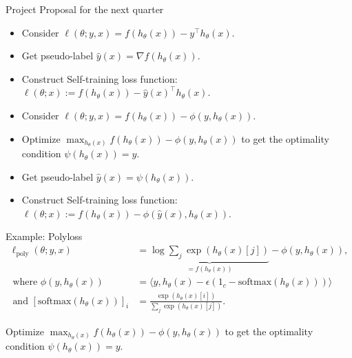 \documentclass{beamer}
\begin{document}
\begin{frame}{Project Proposal for the next quarter}

\begin{exampleblock}{}
\begin{itemize}
 \item Consider $\ell(\theta;y,x) = f( h_{\theta}(x) ) - y^\top h_{\theta}(x)$.  
 \item Get pseudo-label $\hat{y}(x) = \nabla f( h_{\theta}(x) )$.
 \item Construct Self-training loss function: $\ell(\theta;x):=f( h_{\theta}(x) ) - \hat{y}(x)^\top h_{\theta}(x)$.
\end{itemize}
\end{exampleblock}


\begin{block}{}
\begin{itemize}
 \item Consider $\ell(\theta;y,x) = f( h_{\theta}(x) ) - \phi( y, h_{\theta}(x))$.  
 \item Optimize $\max_{h_{\theta}(x)} f( h_{\theta}(x) ) - \phi( y, h_{\theta}(x))$
 to get the optimality condition $\psi( h_{\theta}(x) ) = y$.
 \item Get pseudo-label $\hat{y}(x) = \psi( h_{\theta}(x) )$.
 \item Construct Self-training loss function: $\ell(\theta;x):=f( h_{\theta}(x) ) - 
\phi( \hat{y}(x), h_{\theta}(x))$.
\end{itemize}
\end{block}

\end{frame}

\begin{frame}[t]{Example: Polyloss}
\begin{align}
\ell_{\mathrm{poly}}(\theta;y,x) & = \underbrace{ \log \sum_j \exp\left( h_{\theta}(x)[j] \right) }_{=f(h_{\theta}(x))} - \phi( y, h_{\theta}(x)),
\\ 
\text{ where } \phi( y, h_{\theta}(x)) & = \langle  y,   h_{\theta}(x) - \epsilon (1_c- \mathrm{softmax}(h_{\theta}(x) )) \rangle
\\ \text{ and } [\mathrm{softmax}(h_{\theta}(x) )]_i & = \frac{
\exp \left( h_{\theta}(x)[i] \right)
 }{ \sum_j \exp \left( h_{\theta}(x)[j] \right) }.
\end{align}


\begin{block}{}
Optimize $\max_{h_{\theta}(x)} f( h_{\theta}(x) ) - \phi( y, h_{\theta}(x))$
 to get the optimality condition $\psi( h_{\theta}(x) ) = y$.
\end{block}
\end{frame}
\end{document}

